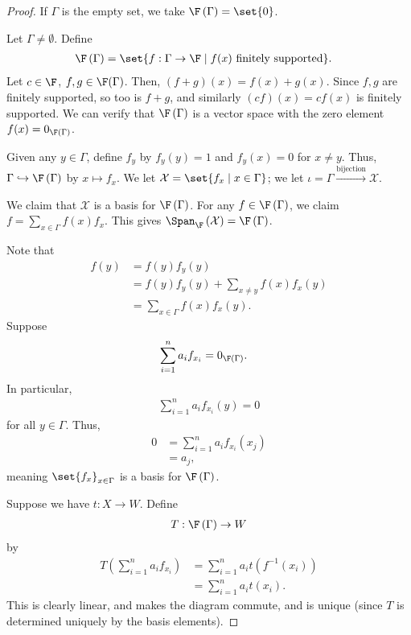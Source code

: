 \documentclass[10pt]{mypackage}
\begin{document}
\begin{proof}
  If $\Gamma$ is the empty set, we take $\F\left(\Gamma\right) = \set{0}$.\newline

  Let $\Gamma \neq \emptyset$. Define
  \begin{align*}
    \F\left(\Gamma\right) &= \set{f: \Gamma\rightarrow \F\mid f(x)\text{ finitely supported}}.
  \end{align*}
  Let $c\in \F$, $f,g\in \F(\Gamma)$. Then, $\left(f+g\right)(x) = f(x) + g(x)$. Since $f,g$ are finitely supported, so too is $f+g$, and similarly $\left(cf\right)(x) = cf(x)$ is finitely supported. We can verify that $\F\left(\Gamma\right)$ is a vector space with the zero element $f(x) = 0_{\F\left(\Gamma\right)}$.\newline

  Given any $y\in \Gamma$, define $f_y$ by $f_y(y) = 1$ and $f_y(x) = 0$ for $x\neq y$. Thus, $\Gamma\hookrightarrow\F\left(\Gamma\right)$ by $x\mapsto f_{x}$. We let $\mathcal{X} = \set{f_x\mid x\in \Gamma}$; we let $\iota = \Gamma \xrightarrow{\text{bijection}}\mathcal{X}$.\newline

  We claim that $\mathcal{X}$ is a basis for $\F\left(\Gamma\right)$. For any $f\in \F\left(\Gamma\right)$, we claim $f = \sum_{x\in \Gamma}f(x)f_x$. This gives $\Span_{\F}\left(\mathcal{X}\right) = \F\left(\Gamma\right)$.\newline

  Note that
  \begin{align*}
    f(y) &= f(y)f_y(y)\\
         &= f(y)f_y(y) + \sum_{x\neq y}f(x)f_x(y)\\
         &= \sum_{x\in\Gamma}f(x)f_x(y).
  \end{align*}
  Suppose
  \begin{align*}
    \sum_{i=1}^{n}a_if_{x_i} &= 0_{\F\left(\Gamma\right)}.
  \end{align*}
  In particular,
  \begin{align*}
    \sum_{i=1}^{n}a_if_{x_i}(y) = 0
  \end{align*}
  for all $y\in \Gamma$. Thus,
  \begin{align*}
    0 &= \sum_{i=1}^{n}a_if_{x_i}\left(x_j\right)\\
      &= a_j,
  \end{align*}
  meaning $\set{f_{x}}_{x\in \Gamma}$ is a basis for $\F\left(\Gamma\right)$.\newline

  Suppose we have $t: X\rightarrow W$. Define
  \begin{align*}
    T: \F\left(\Gamma\right) \rightarrow W
  \end{align*}
  by
  \begin{align*}
    T\left(\sum_{i=1}^{n}a_if_{x_i}\right) &= \sum_{i=1}^{n}a_it\left(f^{-1}\left(x_i\right)\right)\\
                                           &= \sum_{i=1}^{n}a_it\left(x_i\right).
  \end{align*}
  This is clearly linear, and makes the diagram commute, and is unique (since $T$ is determined uniquely by the basis elements).
\end{proof}
\end{document}
